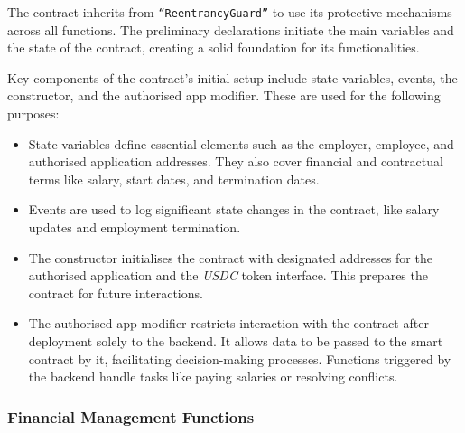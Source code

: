 The contract inherits from \texttt{``ReentrancyGuard''} to use its protective mechanisms across all functions. The preliminary declarations initiate the main variables and the state of the contract, creating a solid foundation for its functionalities.

Key components of the contract's initial setup include state variables, events, the constructor, and the authorised app modifier. These are used for the following purposes:
\begin{itemize}
    \item State variables define essential elements such as the employer, employee, and authorised application addresses. They also cover financial and contractual terms like salary, start dates, and termination dates.
    \item Events are used to log significant state changes in the contract, like salary updates and employment termination.
    \item The constructor initialises the contract with designated addresses for the authorised application and the \textit{USDC} token interface. This prepares the contract for future interactions.
    \item The authorised app modifier restricts interaction with the contract after deployment solely to the backend. It allows data to be passed to the smart contract by it, facilitating decision-making processes. Functions triggered by the backend handle tasks like paying salaries or resolving conflicts.
\end{itemize}

\subsubsection{Financial Management Functions}


